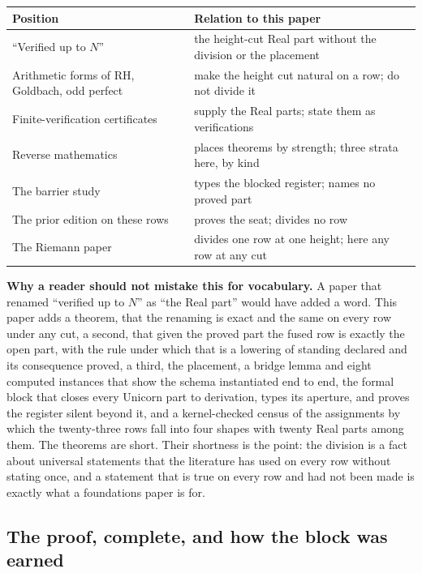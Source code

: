 \documentclass[10pt,twocolumn]{article}
\begin{document}
\begin{table}[!h]
\centering\scriptsize
\renewcommand{\arraystretch}{1.15}
\begin{tabularx}{\columnwidth}{@{}P{0.27\columnwidth} L@{}}
\toprule
\textbf{Position} & \textbf{Relation to this paper} \\
\midrule
``Verified up to $N$'' & the height-cut Real part without the division or the placement \\
Arithmetic forms of RH, Goldbach, odd perfect & make the height cut natural on a row; do not divide it \\
Finite-verification certificates & supply the Real parts; state them as verifications \\
Reverse mathematics & places theorems by strength; three strata here, by kind \\
The barrier study & types the blocked register; names no proved part \\
The prior edition on these rows & proves the seat; divides no row \\
The Riemann paper & divides one row at one height; here any row at any cut \\
\bottomrule
\end{tabularx}
\end{table}

\textbf{Why a reader should not mistake this for vocabulary.} A paper
that renamed ``verified up to \(N\)'' as ``the Real part'' would have
added a word. This paper adds a theorem, that the renaming is exact and
the same on every row under any cut, a second, that given the proved
part the fused row is exactly the open part, with the rule under which
that is a lowering of standing declared and its consequence proved, a
third, the placement, a bridge lemma and eight computed instances that
show the schema instantiated end to end, the formal block that closes
every Unicorn part to derivation, types its aperture, and proves the
register silent beyond it, and a kernel-checked census of the
assignments by which the twenty-three rows fall into four shapes with
twenty Real parts among them. The theorems are short. Their shortness is
the point: the division is a fact about universal statements that the
literature has used on every row without stating once, and a statement
that is true on every row and had not been made is exactly what a
foundations paper is for.

\hypertarget{the-proof-complete-and-how-the-block-was-earned}{%
\subsection{The proof, complete, and how the block was
earned}\label{the-proof-complete-and-how-the-block-was-earned}}
\end{document}
